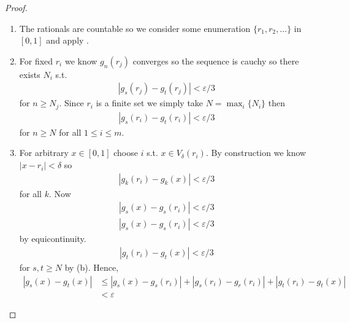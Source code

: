 \begin{proof}
    \begin{enumerate}[label=(\alph*)]
        \item 
        The rationals are countable so we consider some enumeration
        $\{r_1,r_2,...\}$ in $[0,1]$ and apply .
    
        \item
        For fixed $r_i$ we know $g_n(r_j)$ converges so the 
        sequence is cauchy so there exists $N_i$ s.t. 
        \begin{align*}
            |g_s(r_j)-g_t(r_j)|<\varepsilon/3
        \end{align*}
        for $n\geq N_j$.
        Since ${r_i}$ is a finite set we simply take $N=\max_i\{N_i\}$
        then 
        \begin{align*}
            |g_s(r_i)-g_t(r_i)|<\varepsilon/3
        \end{align*}
        for $n\geq N$ for all $1 \leq i \leq m$.
    
        \item
        For arbitrary $x\in[0,1]$ choose $i$ s.t. $x\in V_\delta(r_i)$.
        By construction we know $|x-r_i|<\delta$ so 
        \begin{align*}
            |g_k(r_i)-g_k(x)| < \varepsilon/3
        \end{align*}
        for all $k$. 
        Now
        \begin{gather*}
            |g_s(x)-g_s(r_i)| < \varepsilon/3 \\
            |g_s(x)-g_s(r_i)| < \varepsilon/3
        \end{gather*}
        by equicontinuity.
        \begin{align*}
            |g_t(r_i)-g_t(x)| < \varepsilon/3
        \end{align*}
        for $s,t\geq N$ by (b).
        Hence, 
        \begin{align*}
            |g_s(x)-g_t(x)| &\leq |g_s(x)-g_s(r_i)|+|g_s(r_i)-g_r(r_i)|+|g_t(r_i)-g_t(x)| \\
            &< \varepsilon
        \end{align*}
    \end{enumerate}
\end{proof}